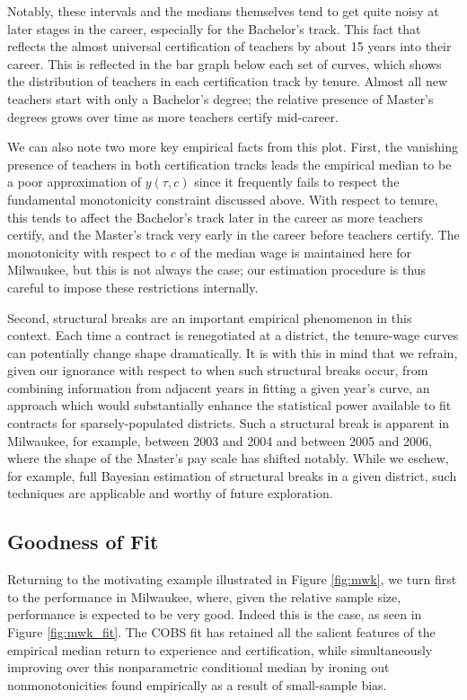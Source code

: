 \documentclass[12pt,]{article}
\begin{document}
Notably, these intervals and the medians themselves tend to get quite
noisy at later stages in the career, especially for the Bachelor's
track. This fact that reflects the almost universal certification of
teachers by about 15 years into their career. This is reflected in the
bar graph below each set of curves, which shows the distribution of
teachers in each certification track by tenure. Almost all new teachers
start with only a Bachelor's degree; the relative presence of Master's
degrees grows over time as more teachers certify mid-career.

We can also note two more key empirical facts from this plot. First, the
vanishing presence of teachers in both certification tracks leads the
empirical median to be a poor approximation of \(y(\tau, c)\) since it
frequently fails to respect the fundamental monotonicity constraint
discussed above. With respect to tenure, this tends to affect the
Bachelor's track later in the career as more teachers certify, and the
Master's track very early in the career before teachers certify. The
monotonicity with respect to \(c\) of the median wage is maintained here
for Milwaukee, but this is not always the case; our estimation procedure
is thus careful to impose these restrictions internally.

Second, structural breaks are an important empirical phenomenon in this
context. Each time a contract is renegotiated at a district, the
tenure-wage curves can potentially change shape dramatically. It is with
this in mind that we refrain, given our ignorance with respect to when
such structural breaks occur, from combining information from adjacent
years in fitting a given year's curve, an approach which would
substantially enhance the statistical power available to fit contracts
for sparsely-populated districts. Such a structural break is apparent in
Milwaukee, for example, between 2003 and 2004 and between 2005 and 2006,
where the shape of the Master's pay scale has shifted notably. While we
eschew, for example, full Bayesian estimation of structural breaks in a
given district, such techniques are applicable and worthy of future
exploration.

\subsection{Goodness of Fit}\label{goodness-of-fit}

Returning to the motivating example illustrated in Figure \ref{fig:mwk},
we turn first to the performance in Milwaukee, where, given the relative
sample size, performance is expected to be very good. Indeed this is the
case, as seen in Figure \ref{fig:mwk_fit}. The COBS fit has retained all
the salient features of the empirical median return to experience and
certification, while simultaneously improving over this nonparametric
conditional median by ironing out nonmonotonicities found empirically as
a result of small-sample bias.
\end{document}
